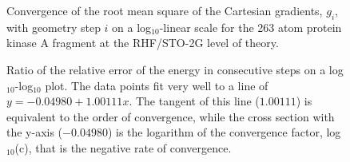 \documentclass[prl,aps,preprint,showpacs,superbib]{revtex4}
\begin{document}
{\begin{figure}[h]
\caption{
Convergence of the root mean square of the Cartesian gradients, $g_{i}$,
with geometry step $i$ on a log$_{10}$-linear  scale for the 
263 atom protein kinase A fragment at the RHF/STO-2G level of theory.}\label{gradientpicture} 
\end{figure}

\begin{figure}[h]
\caption{
Ratio of the relative error of the energy 
in consecutive steps on a log$_{10}$-log$_{10}$ plot.
The data points fit very well to a line of 
$y=-0.04980+1.00111 x$. The tangent of this line ($1.00111$)
is equivalent to the order of convergence, while the
cross section with the y-axis ($-0.04980$) is the
logarithm of the convergence factor, log$_{10}$(c), that is
the negative rate of convergence.
}
\label{loglogplot}
\end{figure}

}
\end{document}
